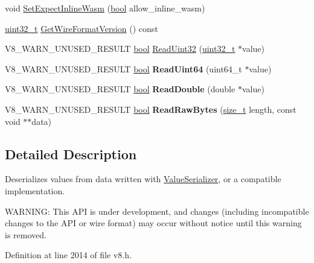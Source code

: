 \begin{DoxyCompactItemize}
\item 
void \mbox{\hyperlink{classv8_1_1ValueDeserializer_a2e393ea834f217238fc144f48fd5caf1}{Set\+Expect\+Inline\+Wasm}} (\mbox{\hyperlink{classbool}{bool}} allow\+\_\+inline\+\_\+wasm)
\item 
\mbox{\hyperlink{classuint32__t}{uint32\+\_\+t}} \mbox{\hyperlink{classv8_1_1ValueDeserializer_aaf8a206c11e0663105e570dd4feb01f9}{Get\+Wire\+Format\+Version}} () const
\item 
V8\+\_\+\+W\+A\+R\+N\+\_\+\+U\+N\+U\+S\+E\+D\+\_\+\+R\+E\+S\+U\+LT \mbox{\hyperlink{classbool}{bool}} \mbox{\hyperlink{classv8_1_1ValueDeserializer_a766073df20a4e460738874f684d9169f}{Read\+Uint32}} (\mbox{\hyperlink{classuint32__t}{uint32\+\_\+t}} $\ast$value)
\item 
\mbox{\label{classv8_1_1ValueDeserializer_a0634cbd370d8ed2472c7169049788dac}} 
V8\+\_\+\+W\+A\+R\+N\+\_\+\+U\+N\+U\+S\+E\+D\+\_\+\+R\+E\+S\+U\+LT \mbox{\hyperlink{classbool}{bool}} {\bfseries Read\+Uint64} (uint64\+\_\+t $\ast$value)
\item 
\mbox{\label{classv8_1_1ValueDeserializer_a55f977a35995dc1b309499188be909ce}} 
V8\+\_\+\+W\+A\+R\+N\+\_\+\+U\+N\+U\+S\+E\+D\+\_\+\+R\+E\+S\+U\+LT \mbox{\hyperlink{classbool}{bool}} {\bfseries Read\+Double} (double $\ast$value)
\item 
\mbox{\label{classv8_1_1ValueDeserializer_aee84cc86ee8d262a36d9fc23909b3bb5}} 
V8\+\_\+\+W\+A\+R\+N\+\_\+\+U\+N\+U\+S\+E\+D\+\_\+\+R\+E\+S\+U\+LT \mbox{\hyperlink{classbool}{bool}} {\bfseries Read\+Raw\+Bytes} (\mbox{\hyperlink{classsize__t}{size\+\_\+t}} length, const void $\ast$$\ast$data)
\end{DoxyCompactItemize}


\subsection{Detailed Description}
Deserializes values from data written with \mbox{\hyperlink{classv8_1_1ValueSerializer}{Value\+Serializer}}, or a compatible implementation.

W\+A\+R\+N\+I\+NG\+: This A\+PI is under development, and changes (including incompatible changes to the A\+PI or wire format) may occur without notice until this warning is removed. 

Definition at line 2014 of file v8.\+h.



